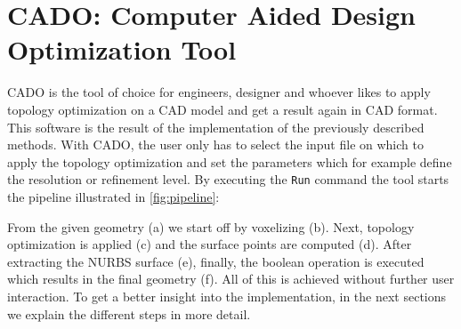 \section{CADO: Computer Aided Design Optimization Tool}
CADO is the tool of choice for engineers, designer and whoever likes to apply topology optimization on a CAD model and get a result again in CAD format. This software is the result of the implementation of the previously described methods. With CADO, the user only has to select the input file on which to apply the topology optimization and set the parameters which for example define the resolution or refinement level. By executing the \texttt{Run} command the tool starts the pipeline illustrated in \autoref{fig:pipeline}: 

From the given geometry (a) we start off by voxelizing (b). Next, topology optimization is applied (c) and the surface points are computed (d). After extracting the NURBS surface (e), finally, the boolean operation is executed which results in the final geometry (f). All of this is achieved without further user interaction. To get a better insight into the implementation, in the next sections we explain the different steps in more detail.
